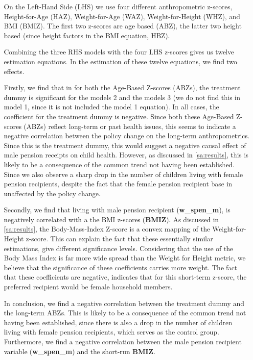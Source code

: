 \begin{refsection}
On the Left-Hand Side (LHS) we use four different anthropometric z-scores,
Height-for-Age (HAZ), Weight-for-Age (WAZ), Weight-for-Height (WHZ), and BMI (BMIZ).
The first two z-scores are age based (ABZ), the latter two height based (since height factors in the BMI equation, HBZ).

Combining the three RHS models with the four LHS z-scores gives us twelve estimation equations.
In the estimation of these twelve equations, we find two effects.

Firstly, we find that in for both the Age-Based Z-scores (ABZs),
the treatment dummy is significant for the models 2 and the models 3
(we do not find this in model 1, since it is not included the model 1 equation).
In all cases, the coefficient for the treatment dummy is negative.
Since both these Age-Based Z-scores (ABZs) reflect long-term or past health issues,
this seems to indicate a negative correlation between the policy change on the long-term anthropometrics.
Since this is the treatment dummy, this would suggest a negative causal effect of male pension receipts on child health.
However, as discussed in \autoref{sa:results},
this is likely to be a consequence of the common trend not having been established.
Since we also observe a sharp drop in the number of children living with female pension recipients,
despite the fact that the female pension recipient base in unaffected by the policy change.

Secondly, we find that living with male pension recipient (\textbf{w\_spen\_m}),
is negatively correlated with a the BMI z-scores (\textbf{BMIZ}).
As discussed in \autoref{sa:results}, the Body-Mass-Index Z-score is a convex mapping of the Weight-for-Height z-score.
This can explain the fact that these essentially similar estimations, give different significance levels.
Considering that the use of the Body Mass Index is far more wide spread than the Weight for Height metric,
we believe that the significance of these coefficients carries more weight.
The fact that these coefficients are negative, indicates that for this short-term z-score,
the preferred recipient would be female household members.

In conclusion, we find a negative correlation between the treatment dummy and the long-term ABZs.
This is likely to be a consequence of the common trend not having been established,
since there is also a drop in the number of children living with female pension recipients, which serves as the control group.
Furthermore, we find a negative correlation between the male pension recipient variable (\textbf{w\_spen\_m}) and the short-run \textbf{BMIZ}.


\end{refsection}
